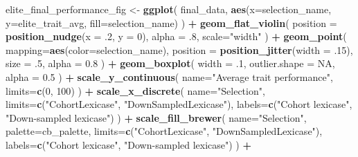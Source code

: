 \documentclass[]{book}
\newenvironment{Shaded}{\begin{snugshade}}{\end{snugshade}}
\newcommand{\DataTypeTok}[1]{\textcolor[rgb]{0.13,0.29,0.53}{#1}}
\newcommand{\DecValTok}[1]{\textcolor[rgb]{0.00,0.00,0.81}{#1}}
\newcommand{\FloatTok}[1]{\textcolor[rgb]{0.00,0.00,0.81}{#1}}
\newcommand{\KeywordTok}[1]{\textcolor[rgb]{0.13,0.29,0.53}{\textbf{#1}}}
\newcommand{\NormalTok}[1]{#1}
\newcommand{\OperatorTok}[1]{\textcolor[rgb]{0.81,0.36,0.00}{\textbf{#1}}}
\newcommand{\OtherTok}[1]{\textcolor[rgb]{0.56,0.35,0.01}{#1}}
\newcommand{\StringTok}[1]{\textcolor[rgb]{0.31,0.60,0.02}{#1}}
\begin{document}
\begin{Shaded}
\begin{Highlighting}[]
\NormalTok{elite_final_performance_fig <-}\StringTok{ }\KeywordTok{ggplot}\NormalTok{(}
\NormalTok{    final_data,}
    \KeywordTok{aes}\NormalTok{(}\DataTypeTok{x=}\NormalTok{selection_name, }\DataTypeTok{y=}\NormalTok{elite_trait_avg, }\DataTypeTok{fill=}\NormalTok{selection_name)}
\NormalTok{  ) }\OperatorTok{+}
\StringTok{  }\KeywordTok{geom_flat_violin}\NormalTok{(}
    \DataTypeTok{position =} \KeywordTok{position_nudge}\NormalTok{(}\DataTypeTok{x =} \FloatTok{.2}\NormalTok{, }\DataTypeTok{y =} \DecValTok{0}\NormalTok{),}
    \DataTypeTok{alpha =} \FloatTok{.8}\NormalTok{,}
    \DataTypeTok{scale=}\StringTok{"width"}
\NormalTok{  ) }\OperatorTok{+}
\StringTok{  }\KeywordTok{geom_point}\NormalTok{(}
    \DataTypeTok{mapping=}\KeywordTok{aes}\NormalTok{(}\DataTypeTok{color=}\NormalTok{selection_name),}
    \DataTypeTok{position =} \KeywordTok{position_jitter}\NormalTok{(}\DataTypeTok{width =} \FloatTok{.15}\NormalTok{),}
    \DataTypeTok{size =} \FloatTok{.5}\NormalTok{,}
    \DataTypeTok{alpha =} \FloatTok{0.8}
\NormalTok{  ) }\OperatorTok{+}
\StringTok{  }\KeywordTok{geom_boxplot}\NormalTok{(}
    \DataTypeTok{width =} \FloatTok{.1}\NormalTok{,}
    \DataTypeTok{outlier.shape =} \OtherTok{NA}\NormalTok{,}
    \DataTypeTok{alpha =} \FloatTok{0.5}
\NormalTok{  ) }\OperatorTok{+}
\StringTok{  }\KeywordTok{scale_y_continuous}\NormalTok{(}
    \DataTypeTok{name=}\StringTok{"Average trait performance"}\NormalTok{,}
    \DataTypeTok{limits=}\KeywordTok{c}\NormalTok{(}\DecValTok{0}\NormalTok{, }\DecValTok{100}\NormalTok{)}
\NormalTok{  ) }\OperatorTok{+}
\StringTok{  }\KeywordTok{scale_x_discrete}\NormalTok{(}
    \DataTypeTok{name=}\StringTok{"Selection"}\NormalTok{,}
    \DataTypeTok{limits=}\KeywordTok{c}\NormalTok{(}\StringTok{"CohortLexicase"}\NormalTok{, }\StringTok{"DownSampledLexicase"}\NormalTok{),}
    \DataTypeTok{labels=}\KeywordTok{c}\NormalTok{(}\StringTok{"Cohort lexicase"}\NormalTok{, }\StringTok{"Down-sampled lexicase"}\NormalTok{)}
\NormalTok{  ) }\OperatorTok{+}
\StringTok{  }\KeywordTok{scale_fill_brewer}\NormalTok{(}
    \DataTypeTok{name=}\StringTok{"Selection"}\NormalTok{,}
    \DataTypeTok{palette=}\NormalTok{cb_palette,}
    \DataTypeTok{limits=}\KeywordTok{c}\NormalTok{(}\StringTok{"CohortLexicase"}\NormalTok{, }\StringTok{"DownSampledLexicase"}\NormalTok{),}
    \DataTypeTok{labels=}\KeywordTok{c}\NormalTok{(}\StringTok{"Cohort lexicase"}\NormalTok{, }\StringTok{"Down-sampled lexicase"}\NormalTok{)}
\NormalTok{  ) }\OperatorTok{+}

\end{Highlighting}
\end{Shaded}
\end{document}
